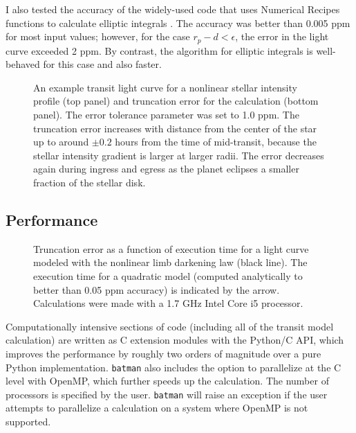 \documentclass[12pt,preprint]{aastex}
\begin{document}
I also tested the accuracy of the widely-used \cite{mandel02} code that uses Numerical Recipes functions to calculate elliptic integrals \citep{press92}.  The accuracy was better than 0.005 ppm for most input values; however, for the case $r_p - d < \epsilon$, the error in the light curve exceeded 2 ppm. By contrast, the \cite{bulirsch65} algorithm for elliptic integrals is well-behaved for this case and also faster.

\begin{figure}
\caption{An example transit light curve for a nonlinear stellar intensity profile (top panel) and truncation error for the calculation (bottom panel).  The error tolerance parameter was set to 1.0 ppm.  The truncation error increases with distance from the center of the star up to around $\pm0.2$ hours from the time of mid-transit, because the stellar intensity gradient is larger at larger radii. The error decreases again during ingress and egress as the planet eclipses a smaller fraction of the stellar disk.}
\label{fig:transit}
\end{figure}


\subsection{Performance}
\begin{figure}
\caption{Truncation error as a function of execution time for a light curve modeled with the nonlinear limb darkening law (black line). The execution time for a quadratic model (computed analytically to better than 0.05 ppm accuracy) is indicated by the arrow. Calculations were made with a 1.7 GHz Intel Core i5 processor.} 
\label{fig:performance}
\end{figure}

Computationally intensive sections of code (including all of the transit model calculation) are written as C extension modules with the Python/C API, which improves the performance by roughly two orders of magnitude over a pure Python implementation.  \texttt{batman} also includes the option to parallelize at the C level with OpenMP, which further speeds up the calculation. The number of processors is specified by the user.  \texttt{batman} will raise an exception if the user attempts to parallelize a calculation on a system where OpenMP is not supported.
\end{document}

